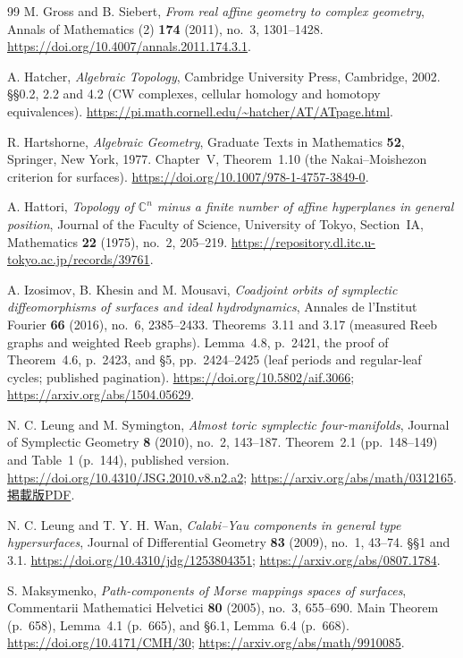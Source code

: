 \begin{thebibliography}{99}
M. Gross and B. Siebert,
\emph{From real affine geometry to complex geometry},
Annals of Mathematics (2) \textbf{174} (2011), no.~3, 1301--1428.
\url{https://doi.org/10.4007/annals.2011.174.3.1}.

A. Hatcher,
\emph{Algebraic Topology},
Cambridge University Press, Cambridge, 2002.
\S\S0.2, 2.2 and 4.2 (CW complexes, cellular homology and homotopy equivalences).
\url{https://pi.math.cornell.edu/~hatcher/AT/ATpage.html}.

R. Hartshorne,
\emph{Algebraic Geometry},
Graduate Texts in Mathematics \textbf{52}, Springer, New York, 1977.
Chapter~V, Theorem~1.10 (the Nakai--Moishezon criterion for surfaces).
\url{https://doi.org/10.1007/978-1-4757-3849-0}.

A. Hattori,
\emph{Topology of $\mathbb C^n$ minus a finite number of affine hyperplanes in general position},
Journal of the Faculty of Science, University of Tokyo, Section~IA, Mathematics
\textbf{22} (1975), no.~2, 205--219.
\url{https://repository.dl.itc.u-tokyo.ac.jp/records/39761}.

A. Izosimov, B. Khesin and M. Mousavi,
\emph{Coadjoint orbits of symplectic diffeomorphisms of surfaces and ideal hydrodynamics},
Annales de l'Institut Fourier \textbf{66} (2016), no.~6, 2385--2433.
Theorems~3.11 and 3.17 (measured Reeb graphs and weighted Reeb graphs).
Lemma~4.8, p.~2421, the proof of Theorem~4.6, p.~2423,
and \S5, pp.~2424--2425 (leaf periods and regular-leaf cycles; published pagination).
\url{https://doi.org/10.5802/aif.3066};
\url{https://arxiv.org/abs/1504.05629}.

N. C. Leung and M. Symington,
\emph{Almost toric symplectic four-manifolds},
Journal of Symplectic Geometry \textbf{8} (2010), no.~2, 143--187.
Theorem~2.1 (pp.~148--149) and Table~1 (p.~144), published version.
\url{https://doi.org/10.4310/JSG.2010.v8.n2.a2};
\url{https://arxiv.org/abs/math/0312165}.
\href{https://archive.ymsc.tsinghua.edu.cn/pacm_download/60/558-2010_Leung_Symington_Almost_Toric_Sympl_Mfd_JSG.pdf}{掲載版PDF}.

N. C. Leung and T. Y. H. Wan,
\emph{Calabi--Yau components in general type hypersurfaces},
Journal of Differential Geometry \textbf{83} (2009), no.~1, 43--74.
\S\S1 and 3.1.
\url{https://doi.org/10.4310/jdg/1253804351};
\url{https://arxiv.org/abs/0807.1784}.

S. Maksymenko,
\emph{Path-components of Morse mappings spaces of surfaces},
Commentarii Mathematici Helvetici \textbf{80} (2005), no.~3, 655--690.
Main Theorem (p.~658), Lemma~4.1 (p.~665), and \S6.1, Lemma~6.4 (p.~668).
\url{https://doi.org/10.4171/CMH/30};
\url{https://arxiv.org/abs/math/9910085}.


\end{thebibliography}
